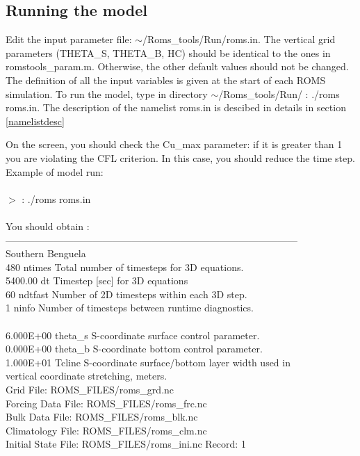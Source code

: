 \subsection{Running the model}
Edit the input parameter file: $\sim$/Roms\_tools/Run/roms.in.  The vertical grid
parameters (THETA\_S, THETA\_B, HC) should be identical to the ones in
romstools\_param.m.  Otherwise, the other default values should not be changed.  The
definition of all the input variables is given at the start of each ROMS simulation.
To run the model, type in directory $\sim$/Roms\_tools/Run/ : ./roms roms.in.  The
description of the namelist roms.in is descibed in details in section \ref{namelistdesc}

On the screen, you should check the Cu\_max parameter: if it is greater than 1 you
are violating the CFL criterion. In this case, you should reduce the time step.
\\
Example of model run:\\
\\
$>$ : ./roms roms.in
\\\\
You should obtain :\\
------------------------------------------------------------------------------------------\\
Southern Benguela\\
480  ntimes   Total number of timesteps for 3D equations.\\
5400.00  dt       Timestep [sec] for 3D equations\\
60  ndtfast  Number of 2D timesteps within each 3D step.\\
1  ninfo    Number of timesteps between runtime diagnostics.\\
\\
6.000E+00  theta\_s  S-coordinate surface control parameter.\\
0.000E+00  theta\_b  S-coordinate bottom control parameter.\\
1.000E+01  Tcline   S-coordinate surface/bottom layer width used in\\
vertical coordinate stretching, meters.\\
Grid File:  ROMS\_FILES/roms\_grd.nc\\
Forcing Data File:  ROMS\_FILES/roms\_frc.nc\\
Bulk Data File:  ROMS\_FILES/roms\_blk.nc\\
Climatology File:  ROMS\_FILES/roms\_clm.nc\\
Initial State File:  ROMS\_FILES/roms\_ini.nc    Record:  1\\
